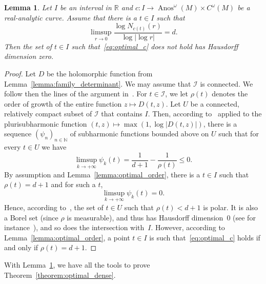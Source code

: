 \documentclass[10pt]{amsart}
\newtheorem{lemm}[theo]{Lemma}\newtheorem{prop}[theo]{Proposition}\newtheorem{coro}[theo]{Corollary}\newtheorem{conj}[theo]{Conjecture}
\theoremstyle{definition}\newtheorem{defi}[theo]{Definition}\newtheorem{rema}[theo]{Remark}\newtheorem{exam}[theo]{Example}\newtheorem{exem}[theo]{Example}\newtheorem{nota}[theo]{Notation}
\DeclareMathOperator{\Anos}{Anos}
\newcommand{\clI}{\mathcal{I}}
\newcommand{\bbN}{\mathbb{N}}
\newcommand{\bbR}{\mathbb{R}}
\begin{document}
\begin{lemm}\label{lemma:generic_curve}
Let $I$ be an interval in $\bbR$ and $c : I \to \Anos^\omega(M) \times C^\omega(M)$ be a real-analytic curve. Assume that there is a $t \in I$ such that
\begin{equation}\label{eq:optimal_c}
\limsup_{r \to 0} \frac{\log N_{c(t)}(r)}{\log |\log r|} = d.
\end{equation}
Then the set of $t \in I$ such that~\eqref{eq:optimal_c} does not hold has Hausdorff dimension zero.
\end{lemm}

\begin{proof}
Let $D$ be the holomorphic function from Lemma~\ref{lemma:family_determinant}. We may assume that $\clI $ is connected. We follow then the lines of the argument in~\cite[p.~309]{bandtlow_naud}. For $t \in \clI $, we let $\rho(t)$ denotes the order of growth of the entire function $z \mapsto D(t,z)$. Let $U$ be a connected, relatively compact subset of $\clI $ that contains $I$. Then, according to~\cite[Proposition~1.40]{book_lelong_gruman} applied to the plurisubharmonic function $(t,z) \mapsto \max(1,\log |D(t,z)|)$, there is a sequence $(\psi_n)_{n \in \bbN}$ of subharmonic functions bounded above on $U$ such that for every $t \in U$ we have
\begin{equation*}
\limsup_{k \to +\infty} \psi_k(t)= \frac{1}{d+1} - \frac{1}{\rho(t)} \leq 0.
\end{equation*}
By assumption and Lemma~\ref{lemma:optimal_order}, there is a $t \in I$ such that $\rho(t) = d+1$ and for such a $t$,
\begin{equation*}
\limsup_{k \to +\infty} \psi_k(t)= 0.
\end{equation*}
Hence, according to~\cite[Proposition~1.39]{book_lelong_gruman}, the set of $t \in U$ such that $\rho(t) < d+1$ is polar. It is also a Borel set (since $\rho$ is measurable), and thus has Hausdorff dimension~$0$ (see for instance~\cite[Theorems~5.10 and 5.13]{hayman_kennedy_book}), and so does the intersection with~$I$. However, according to Lemma~\ref{lemma:optimal_order}, a point $t \in I$ is such that~\eqref{eq:optimal_c} holds if and only if $\rho(t) = d+1$.
\end{proof}

With Lemma~\ref{lemma:generic_curve}, we have all the tools to prove Theorem~\ref{theorem:optimal_dense}.
\end{document}
